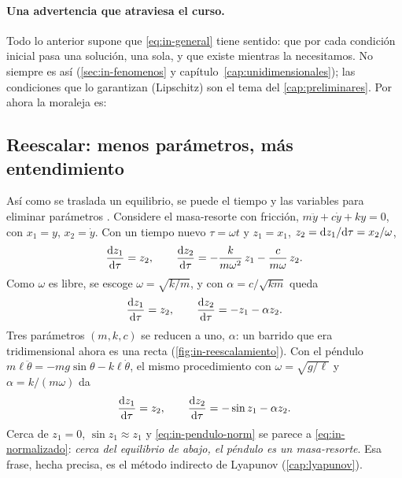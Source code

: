 \paragraph{Una advertencia que atraviesa el curso.} Todo lo anterior supone que \eqref{eq:in-general} tiene sentido: que por cada condición inicial pasa una solución, una sola, y que existe mientras la necesitamos. No siempre es así (\cref{sec:in-fenomenos} y capítulo~\ref{cap:unidimensionales}); las condiciones que lo garantizan (Lipschitz) son el tema del \cref{cap:preliminares}. Por ahora la moraleja es: 

\subsection{Reescalar: menos parámetros, más entendimiento}
\label{sec:in-reescalar}

Así como se traslada un equilibrio, se puede  el tiempo y las variables para eliminar parámetros \citep{KeBr23}. Considere el masa-resorte con fricción, $m\ddot y+c\dot y+ky=0$, con $x_1=y$, $x_2=\dot y$. Con un tiempo nuevo $\tau=\omega t$ y $z_1=x_1$, $z_2=\mathrm{d} z_1/\mathrm{d}\tau=x_2/\omega$,
\[
  \frac{\mathrm{d} z_1}{\mathrm{d}\tau}=z_2,\qquad \frac{\mathrm{d} z_2}{\mathrm{d}\tau}=-\frac{k}{m\omega^2}\,z_1-\frac{c}{m\omega}\,z_2 .
\]
Como $\omega$ es libre, se escoge $\omega=\sqrt{k/m}$, y con $\alpha=c/\sqrt{km}$ queda
\begin{equation}
  \frac{\mathrm{d} z_1}{\mathrm{d}\tau}=z_2,\qquad\frac{\mathrm{d} z_2}{\mathrm{d}\tau}=-z_1-\alpha z_2 .
  \label{eq:in-normalizado}
\end{equation}
Tres parámetros $(m,k,c)$ se reducen a uno, $\alpha$: un barrido que era tridimensional ahora es una recta (\cref{fig:in-reescalamiento}). Con el péndulo $m\ell\ddot\theta=-mg\sin\theta-k\ell\dot\theta$, el mismo procedimiento con $\omega=\sqrt{g/\ell}$ y $\alpha=k/(m\omega)$ da
\begin{equation}
  \frac{\mathrm{d} z_1}{\mathrm{d}\tau}=z_2,\qquad\frac{\mathrm{d} z_2}{\mathrm{d}\tau}=-\sin z_1-\alpha z_2 .
  \label{eq:in-pendulo-norm}
\end{equation}
Cerca de $z_1=0$, $\sin z_1\approx z_1$ y \eqref{eq:in-pendulo-norm} se parece a \eqref{eq:in-normalizado}: \emph{cerca del equilibrio de abajo, el péndulo es un masa-resorte}. Esa frase, hecha precisa, es el método indirecto de Lyapunov (\cref{cap:lyapunov}).

